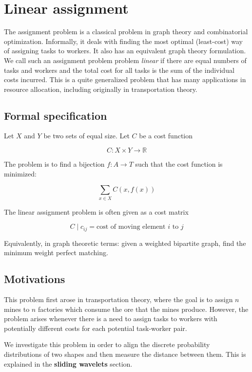 \documentclass[../tech_report_1.tex]{subfiles}
\begin{document}
\section{Linear assignment}

The assignment problem is a classical problem in graph theory and combinatorial optimization\cite{burkard1999linear}. Informally, it deals with finding the most optimal (least-cost) way of assigning tasks to workers. It also has an equivalent graph theory formulation. We call such an assignment problem problem \textit{linear} if there are equal numbers of tasks and workers and the total cost for all tasks is the sum of the individual costs incurred. This is a quite generalized problem that has many applications in resource allocation, including originally in transportation theory.

\subsection{Formal specification}

Let $X$ and $Y$ be two sets of equal size. Let $C$ be a cost function

$$C: X \times Y \rightarrow \mathbb{R}$$

The problem is to find a bijection $f: A \rightarrow T$ such that the cost function is minimized:

$$ \sum_{x \in X} C(x,f(x))$$

The linear assignment problem is often given as a cost matrix

$$ C \mid c_{ij} = \text{cost of moving element } i \text{ to } j$$

Equivalently, in graph theoretic terms: given a weighted bipartite graph, find the minimum weight perfect matching.

\subsection{Motivations}

This problem first arose in transportation theory, where the goal is to assign $n$ mines to $n$ factories which consume the ore that the mines produce. However, the problem arises whenever there is a need to assign tasks to workers with potentially different costs for each potential task-worker pair.

We investigate this problem in order to align the discrete probability distributions of two shapes and then measure the distance between them. This is explained in the \textbf{sliding wavelets} section.
\end{document}
